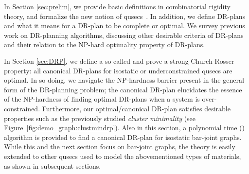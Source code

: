 In Section \ref{sec:prelim}, we provide basic definitions in combinatorial rigidity theory,  and formalize the new notion of qusecs~\cite{sitharam2010optimized,sitharam2006well,sitharam2010reconciling}.
In addition, we define DR-plans and what it means for a DR-plan to be complete or optimal. We survey previous work on DR-planning algorithms, discussing other desirable criteria of DR-plans and their relation to the NP-hard optimality property of DR-plans.



In Section \ref{sec:DRP}, we define a so-called  and prove a strong Church-Rosser property: all canonical DR-plans for isostatic or underconstrained qusecs are optimal. In so doing, we navigate the NP-hardness barrier present in the general form of the DR-planning problem; the canonical DR-plan elucidates the essence of the NP-hardness of finding optimal DR-plans when a system is over-constrained. Furthermore, our optimal/canonical DR-plan satisfies desirable properties such as the previously studied {\em cluster minimality}  \cite{hoffman2001decompositionI} (see Figure~\ref{fig:demo_graph:clustmindrp}). Also in this section, a polynomial time (\candrpcomplexity) algorithm is provided to find a canonical DR-plan for isostatic bar-joint graphs.  While this and the next section focus on bar-joint graphs, the theory is easily extended to other qusecs used to model the abovementioned types of materials, as shown in subsequent sections.


